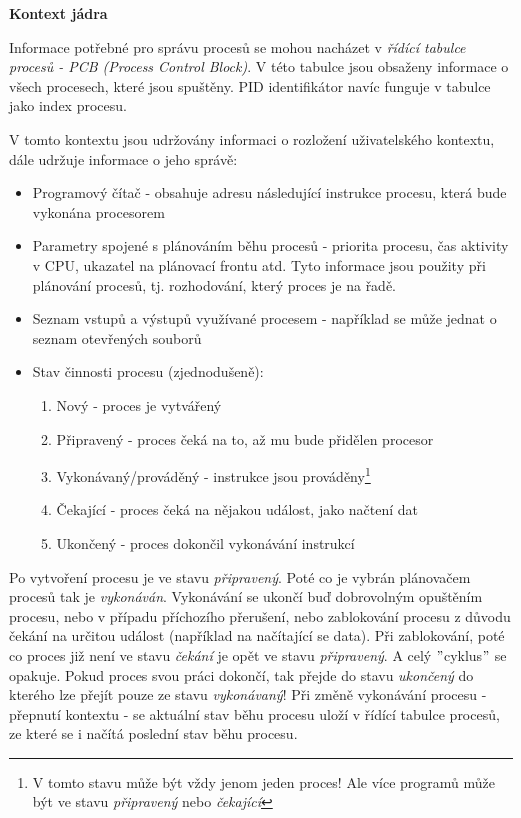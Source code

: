 \begin{Large}
    \vspace{0,5cm}
    \textbf{Kontext jádra}
\end{Large}

Informace potřebné pro správu procesů se mohou nacházet v \textit{řídící tabulce procesů - PCB (Process Control Block)}. V této tabulce jsou obsaženy informace o všech procesech, které jsou spuštěny. PID identifikátor navíc funguje v tabulce jako index procesu. 

\vspace{0,5cm}

V tomto kontextu jsou udržovány informaci o rozložení uživatelského kontextu, dále udržuje informace o jeho správě:
\begin{itemize}
    \item Programový čítač - obsahuje adresu následující instrukce procesu, která bude vykonána procesorem
    \item Parametry spojené s plánováním běhu procesů - priorita procesu, čas aktivity v CPU, ukazatel na plánovací frontu atd. Tyto informace jsou použity při plánování procesů, tj. rozhodování, který proces je na řadě. 
    \item Seznam vstupů a výstupů využívané procesem - například se může jednat o seznam otevřených souborů
    
    \newpage
    
    \item Stav činnosti procesu (zjednodušeně):
    \begin{enumerate}
        \item Nový - proces je vytvářený
        \item Připravený - proces čeká na to, až mu bude přidělen procesor
        \item Vykonávaný/prováděný - instrukce jsou prováděny\footnote{V tomto stavu může být vždy jenom jeden proces! Ale více programů může být ve stavu \textit{připravený} nebo \textit{čekající}}
        \item Čekající - proces čeká na nějakou událost, jako načtení dat
        \item Ukončený - proces dokončil vykonávání instrukcí
    \end{enumerate}
\end{itemize}

Po vytvoření procesu je ve stavu \textit{připravený}. Poté co je vybrán plánovačem procesů tak je \textit{vykonáván}. Vykonávání se ukončí buď dobrovolným opuštěním procesu, nebo v případu příchozího přerušení, nebo zablokování procesu z důvodu čekání na určitou událost (například na načítající se data). Při zablokování, poté co proces již není ve stavu \textit{čekání} je opět ve stavu \textit{připravený}. A celý $"$cyklus$"$ se opakuje. Pokud proces svou práci dokončí, tak přejde do stavu \textit{ukončený} do kterého lze přejít pouze ze stavu \textit{vykonávaný}! Při změně vykonávání procesu - přepnutí kontextu - se aktuální stav běhu procesu uloží v řídící tabulce procesů, ze které se i načítá poslední stav běhu procesu.

